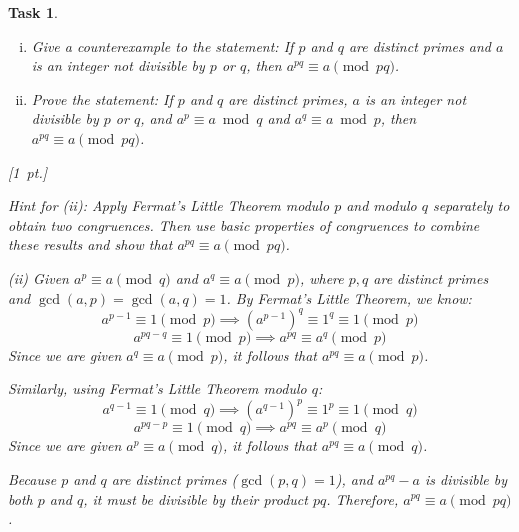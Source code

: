 \documentclass[11pt,twoside,a4paper]{article}
\theoremstyle{exercise}
\newtheorem{exercise}{Task}
\begin{document}
\begin{exercise}
\begin{enumerate}[(a)]
\begin{enumerate}[(i)]
    \item Give a counterexample to the statement: If $p$ and $q$ are distinct primes and $a$ is an integer not divisible by $p$ or $q$, then $a^{pq}\equiv a\pmod {pq}$.
    \item Prove the statement: If $p$ and $q$ are distinct primes, $a$ is an integer not divisible by $p$ or $q$, and $a^p\equiv a\bmod q$ and $a^q\equiv a\bmod p$, then $a^{pq}\equiv a\pmod {pq}$.
\end{enumerate}
 \hfill [1~pt.]

  \textit{Hint for (ii):} Apply Fermat’s Little Theorem modulo $p$ and modulo $q$ separately to obtain two congruences. 
Then use basic properties of congruences to combine these results and show that $a^{pq} \equiv a \pmod{pq}$.

\vspace{0.5cm}
(ii) Given $a^p \equiv a \pmod q$ and $a^q \equiv a \pmod p$, where $p, q$ are distinct primes and $\gcd(a, p) = \gcd(a, q) = 1$.
By Fermat's Little Theorem, we know:
\[ a^{p-1} \equiv 1 \pmod p \implies (a^{p-1})^q \equiv 1^q \equiv 1 \pmod p \]
\[ a^{pq-q} \equiv 1 \pmod p \implies a^{pq} \equiv a^q \pmod p \]
Since we are given $a^q \equiv a \pmod p$, it follows that $a^{pq} \equiv a \pmod p$.

Similarly, using Fermat's Little Theorem modulo $q$:
\[ a^{q-1} \equiv 1 \pmod q \implies (a^{q-1})^p \equiv 1^p \equiv 1 \pmod q \]
\[ a^{pq-p} \equiv 1 \pmod q \implies a^{pq} \equiv a^p \pmod q \]
Since we are given $a^p \equiv a \pmod q$, it follows that $a^{pq} \equiv a \pmod q$.

Because $p$ and $q$ are distinct primes ($\gcd(p,q)=1$), and $a^{pq}-a$ is divisible by both $p$ and $q$, it must be divisible by their product $pq$. 
Therefore, $a^{pq} \equiv a \pmod{pq}$.
\end{enumerate}
\end{exercise}
\end{document}
